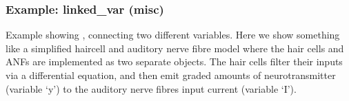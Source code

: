 \documentclass[letterpaper,10pt,english]{manual}
\begin{document}
\resetcurrentobjects
\hypertarget{--doc-examples-misc_linked_var}{}

\hypertarget{index-52}{}\subsubsection{Example: linked\_var (misc)}

Example showing \hyperlink{brian.linked_var}{}, connecting two different \hyperlink{brian.NeuronGroup}{}
variables. Here we show something like a simplified haircell and auditory nerve
fibre model where the hair cells and ANFs are implemented as two separate
\hyperlink{brian.NeuronGroup}{} objects. The hair cells filter their inputs via a
differential equation, and then emit graded amounts of neurotransmitter
(variable `y') to the auditory nerve fibres input current (variable `I').
\end{document}
